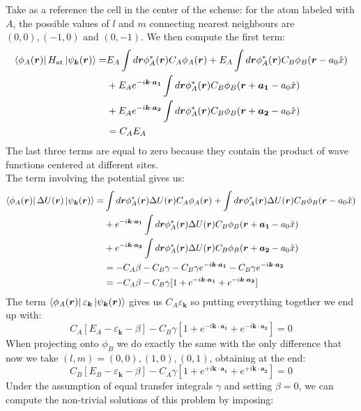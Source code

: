 \documentclass[10.75pt,a4paper,openright,bottom=2cm]{article}
\renewcommand{\Vec}[1]{\boldsymbol{#1}}
\begin{document}
Take as a reference the cell in the center of the scheme: for the atom labeled with $A$, the possible values of $l$ and $m$ connecting nearest neighbours are $(0,0), (-1,0)$ and $(0,-1)$. We then compute the first term:
\begin{align*}
\bra{\phi_A(\Vec{r})}H_{\text{at}}\ket{\psi_{\Vec{k}}(\Vec{r})}=&E_A\int d\Vec{r}\phi_A^*(\Vec{r})C_A\phi_A(\Vec{r})+E_A\int d\Vec{r}\phi_A^*(\Vec{r})C_B\phi_B(\Vec{r}-a_0\hat{x})\\
&+E_Ae^{-i\Vec{k}\cdot\Vec{a_1}}\int d\Vec{r}\phi_A^*(\Vec{r})C_B\phi_B(\Vec{r}+\Vec{a_1}-a_0\hat{x})\\
&+E_Ae^{-i\Vec{k}\cdot\Vec{a_2}}\int d\Vec{r}\phi_A^*(\Vec{r})C_B\phi_B(\Vec{r}+\Vec{a_2}-a_0\hat{x})\\
&=C_AE_A
\end{align*}
The last three terms are equal to zero because they contain the product of wave functions centered at different sites.\\
The term involving the potential gives us:
\begin{align*}
\bra{\phi_A(\Vec{r})}\Delta U(\Vec{r})\ket{\psi_{\Vec{k}}(\Vec{r})}=&\int d\Vec{r}\phi_A^*(\Vec{r})\Delta U(\Vec{r})C_A\phi_A(\Vec{r})+\int d\Vec{r}\phi_A^*(\Vec{r})\Delta U(\Vec{r})C_B\phi_B(\Vec{r}-a_0\hat{x})\\
&+e^{-i\Vec{k}\cdot\Vec{a_1}}\int d\Vec{r}\phi_A^*(\Vec{r})\Delta U(\Vec{r})C_B\phi_B(\Vec{r}+\Vec{a_1}-a_0\hat{x})\\
&+e^{-i\Vec{k}\cdot\Vec{a_2}}\int d\Vec{r}\phi_A^*(\Vec{r})\Delta U(\Vec{r})C_B\phi_B(\Vec{r}+\Vec{a_2}-a_0\hat{x})\\
&=-C_A\beta-C_B\gamma-C_B\gamma e^{-i\Vec{k}\cdot\Vec{a_1}}-C_B\gamma e^{-i\Vec{k}\cdot\Vec{a_2}}\\
&=-C_A\beta-C_B\gamma[1+e^{-i\Vec{k}\cdot\Vec{a_1}}+e^{-i\Vec{k}\cdot\Vec{a_2}}]
\end{align*}
The term $\bra{\phi_A(\Vec{r})}\varepsilon_{\Vec{k}}\ket{\psi_{\Vec{k}}(\Vec{r})}$ gives us $C_A\varepsilon_{\Vec{k}}$ so putting everything together we end up with:
\[
C_A[E_A-\varepsilon_{\Vec{k}}-\beta]-C_B\gamma[1+e^{-i\Vec{k}\cdot\Vec{a_1}}+e^{-i\Vec{k}\cdot\Vec{a_2}}]=0
\]
When projecting onto $\phi_B$ we do exactly the same with the only difference that now we take $(l,m)=(0,0),(1,0),(0,1)$, obtaining at the end:
\[
C_B[E_B-\varepsilon_{\Vec{k}}-\beta]-C_A\gamma[1+e^{+i\Vec{k}\cdot\Vec{a_1}}+e^{+i\Vec{k}\cdot\Vec{a_2}}]=0
\]
Under the assumption of equal transfer integrals $\gamma$ and setting $\beta=0$, we can compute the non-trivial solutions of this problem by imposing:
\end{document}
